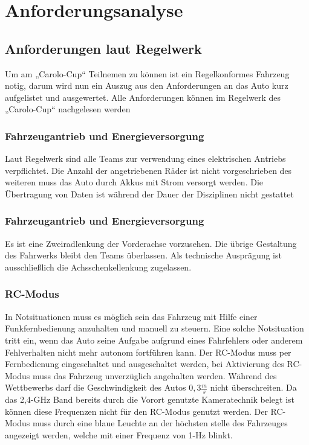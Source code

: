 
\chapter{Anforderungsanalyse}

\section{Anforderungen laut Regelwerk}
Um am „Carolo-Cup“ Teilnemen zu können ist ein Regelkonformes Fahrzeug notig, darum wird nun ein Auszug aus den Anforderungen an das Auto kurz aufgelistet und ausgewertet.
Alle Anforderungen können im Regelwerk des „Carolo-Cup“ nachgelesen werden \cite{website-carolo-cup-regelwerk}


\subsection{Fahrzeugantrieb und Energieversorgung}
Laut Regelwerk sind alle Teams zur verwendung eines elektrischen Antriebs verpflichtet.
Die Anzahl der angetriebenen Räder ist nicht vorgeschrieben
des weiteren muss das Auto durch Akkus mit Strom versorgt werden.
Die Übertragung von Daten ist während der Dauer der Disziplinen nicht gestattet

\subsection{Fahrzeugantrieb und Energieversorgung}
Es ist eine Zweiradlenkung der Vorderachse vorzusehen. Die übrige Gestaltung des Fahrwerks bleibt den Teams überlassen. Als
technische Ausprägung ist ausschließlich die Achsschenkellenkung zugelassen.

\subsection{RC-Modus}
In Notsituationen muss es möglich sein das Fahrzeug mit Hilfe einer Funkfernbedienung anzuhalten und manuell zu steuern. Eine solche Notsituation tritt ein, wenn
das Auto seine Aufgabe aufgrund eines Fahrfehlers oder anderem Fehlverhalten nicht mehr autonom fortführen kann.
Der RC-Modus muss per Fernbedienung eingeschaltet und ausgeschaltet werden, bei Aktivierung des RC-Modus muss das Fahrzeug unverzüglich angehalten werden.
Während des Wettbewerbs darf die Geschwindigkeit des Autos $0,3\frac{m}{s}$ nicht überschreiten.
Da das 2,4-GHz Band bereits durch die Vorort genutzte Kameratechnik belegt ist können diese Frequenzen nicht für den RC-Modus genutzt werden.
Der RC-Modus muss durch eine blaue Leuchte an der höchsten stelle des Fahrzeuges angezeigt werden, welche mit einer Frequenz von 1-Hz blinkt.

